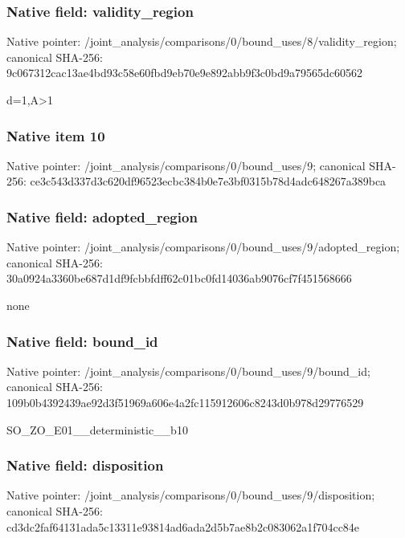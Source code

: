 \documentclass[10pt,a4paper]{article}
\begin{document}
\subsubsection{Native field: validity\_\allowbreak{}region}
Native pointer: /joint\_\allowbreak{}analysis/comparisons/0/bound\_\allowbreak{}uses/8/validity\_\allowbreak{}region; canonical SHA-256: 9c067312cac13ae4bd93c58e60fbd9eb70e9e892abb9f3c0bd9a79565dc60562

\begingroup\raggedright\sloppy d=\allowbreak{}1,\allowbreak{}A>1\par\endgroup

\subsubsection{Native item 10}
Native pointer: /joint\_\allowbreak{}analysis/comparisons/0/bound\_\allowbreak{}uses/9; canonical SHA-256: ce3c543d337d3c620df96523ecbc384b0e7e3bf0315b78d4adc648267a389bca

\subsubsection{Native field: adopted\_\allowbreak{}region}
Native pointer: /joint\_\allowbreak{}analysis/comparisons/0/bound\_\allowbreak{}uses/9/adopted\_\allowbreak{}region; canonical SHA-256: 30a0924a3360be687d1df9fcbbfdff62c01bc0fd14036ab9076cf7f451568666

\begingroup\raggedright\sloppy none\par\endgroup

\subsubsection{Native field: bound\_\allowbreak{}id}
Native pointer: /joint\_\allowbreak{}analysis/comparisons/0/bound\_\allowbreak{}uses/9/bound\_\allowbreak{}id; canonical SHA-256: 109b0b4392439ae92d3f51969a606e4a2fc115912606c8243d0b978d29776529

\begingroup\raggedright\sloppy SO\_\allowbreak{}ZO\_\allowbreak{}E01\_\allowbreak{}\_\allowbreak{}deterministic\_\allowbreak{}\_\allowbreak{}b10\par\endgroup

\subsubsection{Native field: disposition}
Native pointer: /joint\_\allowbreak{}analysis/comparisons/0/bound\_\allowbreak{}uses/9/disposition; canonical SHA-256: cd3dc2faf64131ada5c13311e93814ad6ada2d5b7ae8b2c083062a1f704cc84e
\end{document}
